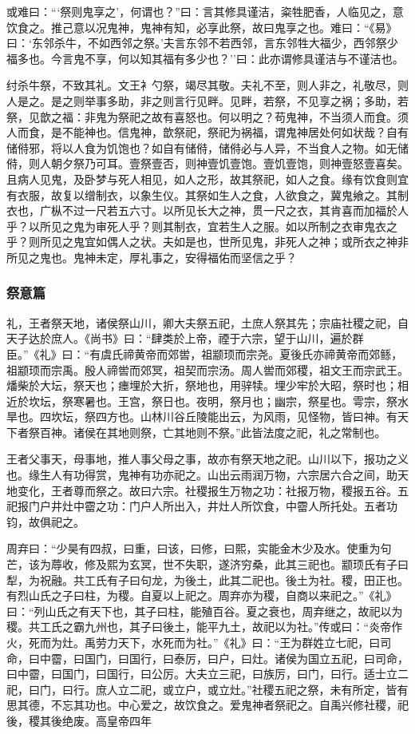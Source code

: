 \documentclass[]{article}
\begin{document}
或难曰：```祭则鬼享之'，何谓也？''曰：言其修具谨洁，粢牲肥香，人临见之，意饮食之。推己意以况鬼神，鬼神有知，必享此祭，故曰鬼享之也。难曰：``《易》曰：`东邻杀牛，不如西邻之祭。'夫言东邻不若西邻，言东邻牲大福少，西邻祭少福多也。今言鬼不享，何以知其福有多少也？''曰：此亦谓修具谨洁与不谨洁也。

纣杀牛祭，不致其礼。文王衤勺祭，竭尽其敬。夫礼不至，则人非之，礼敬尽，则人是之。是之则举事多助，非之则言行见畔。见畔，若祭，不见享之祸；多助，若祭，见歆之福：非鬼为祭祀之故有喜怒也。何以明之？苟鬼神，不当须人而食。须人而食，是不能神也。信鬼神，歆祭祀，祭祀为祸福，谓鬼神居处何如状哉？自有储偫邪，将以人食为饥饱也？如自有储偫，储偫必与人异，不当食人之物。如无储偫，则人朝夕祭乃可耳。壹祭壹否，则神壹饥壹饱。壹饥壹饱，则神壹怒壹喜矣。且病人见鬼，及卧梦与死人相见，如人之形，故其祭祀，如人之食。缘有饮食则宜有衣服，故复以缯制衣，以象生仪。其祭如生人之食，人欲食之，冀鬼飨之。其制衣也，广枞不过一尺若五六寸。以所见长大之神，贯一尺之衣，其肯喜而加福於人乎？以所见之鬼为审死人乎？则其制衣，宜若生人之服。如以所制之衣审鬼衣之乎？则所见之鬼宜如偶人之状。夫如是也，世所见鬼，非死人之神；或所衣之神非所见之鬼也。鬼神未定，厚礼事之，安得福佑而坚信之乎？

\hypertarget{header-n868}{%
\subsubsection{祭意篇}\label{header-n868}}

礼，王者祭天地，诸侯祭山川，卿大夫祭五祀，土庶人祭其先；宗庙社稷之祀，自天子达於庶人。《尚书》曰：``肆类於上帝，禋于六宗，望于山川，遍於群臣。''《礼》曰：``有虞氏禘黄帝而郊喾，祖颛顼而宗尧。夏後氏亦禘黄帝而郊鲧，祖颛顼而宗禹。殷人禘喾而郊冥，祖契而宗汤。周人喾而郊稷，祖文王而宗武王。燔柴於大坛，祭天也；瘗埋於大折，祭地也，用骍犊。埋少牢於大昭，祭时也；相近於坎坛，祭寒暑也。王宫，祭日也。夜明，祭月也；幽宗，祭星也。雩宗，祭水旱也。四坎坛，祭四方也。山林川谷丘陵能出云，为风雨，见怪物，皆曰神。有天下者祭百神。诸侯在其地则祭，亡其地则不祭。''此皆法度之祀，礼之常制也。

王者父事天，母事地，推人事父母之事，故亦有祭天地之祀。山川以下，报功之义也。缘生人有功得赏，鬼神有功亦祀之。山出云雨润万物，六宗居六合之间，助天地变化，王者尊而祭之。故曰六宗。社稷报生万物之功：社报万物，稷报五谷。五祀报门户井灶中霤之功：门户人所出入，井灶人所饮食，中霤人所托处。五者功钧，故俱祀之。

周弃曰：``少昊有四叔，曰重，曰该，曰修，曰熙，实能金木少及水。使重为句芒，该为蓐收，修及熙为玄冥，世不失职，遂济穷桑，此其三祀也。颛顼氏有子曰犁，为祝融。共工氏有子曰句龙，为後土，此其二祀也。後土为社。稷，田正也。有烈山氏之子曰柱，为稷。自夏以上祀之。周弃亦为稷，自商以来祀之。''《礼》曰：``列山氏之有天下也，其子曰柱，能殖百谷。夏之衰也，周弃继之，故祀以为稷。共工氏之霸九州也，其子曰後土，能平九土，故祀以为社。''传或曰：``炎帝作火，死而为灶。禹劳力天下，水死而为社。''《礼》曰：``王为群姓立七祀，曰司命，曰中霤，曰国门，曰国行，曰泰厉，曰户，曰灶。诸侯为国立五祀，曰司命，曰中霤，曰国门，曰国行，曰公厉。大夫立三祀，曰族厉，曰门，曰行。适士立二祀，曰门，曰行。庶人立二祀，或立户，或立灶。''社稷五祀之祭，未有所定，皆有思其德，不忘其功也。中心爱之，故饮食之。爱鬼神者祭祀之。自禹兴修社稷，祀後，稷其後绝废。高皇帝四年
\end{document}
